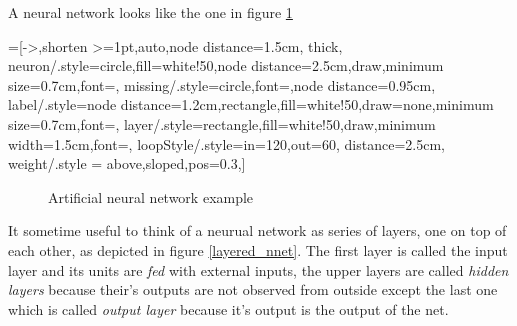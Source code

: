 A neural network looks like the one in figure \ref{fully_connected}

=[->,shorten >=1pt,auto,node distance=1.5cm,
  thick,
  neuron/.style={circle,fill=white!50,node distance=2.5cm,draw,minimum size=0.7cm,font=\sffamily\normalsize},
  missing/.style={circle,font=\sffamily\Large,node distance=0.95cm},
  label/.style={node distance=1.2cm,rectangle,fill=white!50,draw=none,minimum size=0.7cm,font=\sffamily\normalsize},
  layer/.style={rectangle,fill=white!50,draw,minimum width=1.5cm,font=\sffamily\Large},
  loopStyle/.style={in=120,out=60, distance=2.5cm},
  weight/.style = {above,sloped,pos=0.3},]
\begin{figure}
 \centering
{}
\caption{Artificial neural network example}
\label{fully_connected}
\end{figure}


It sometime useful to think of a neurual network as series of layers, one on top of each other, as depicted in figure \ref{layered_nnet}. The first layer is called the input layer and its units are \textit{fed}
with external inputs, the upper layers are called \textit{hidden layers} because their's outputs are not observed from outside except the last one which is called \textit{output layer} because it's output 
is the output of the net.

